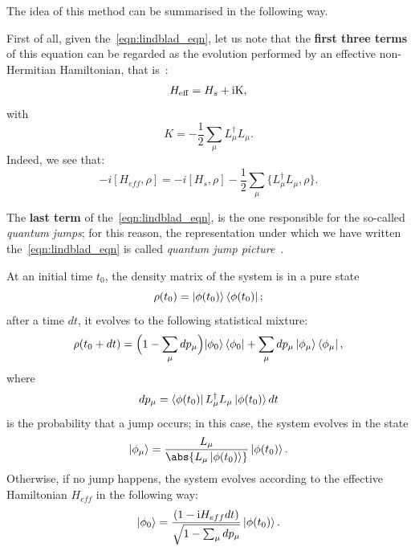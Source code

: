 The idea of this method can be summarised in the following way.

First of all, given the~\ref{eqn:lindblad_eqn}, let us note that the \textbf{first three terms} of this equation can be regarded as the evolution performed by an effective non-Hermitian Hamiltonian, that is~\cite{PhysRevA.69.062317}:
\[
H_{\rm{eff}} = H_s + \rm{i}K,
\]
with
\[
K = -\frac{1}{2}\sum_\mu L_{\mu}^{\dagger}L_{\mu}.
\]
Indeed, we see that:
\[
    -i[H_{eff}, \rho] = -i[H_s, \rho] - \frac{1}{2}\sum_\mu \{L_{\mu}^{\dagger}L_{\mu}, \rho\}.
\]

The \textbf{last term} of the~\ref{eqn:lindblad_eqn}, is the one responsible for the so-called \emph{quantum jumps}; for this reason, the representation under which we have written the~\ref{eqn:lindblad_eqn} is called \emph{quantum jump picture}~\cite{PhysRevA.69.062317}. 

At an initial time $t_0$, the density matrix of the system is in a pure state
\[
\rho(t_0) = \ket{\phi(t_0)}\bra{\phi(t_0)};
\]
after a time $dt$, it evolves to the following statistical mixture:
\begin{equation}
    \rho(t_0 + dt) = \Bigl(1-\sum_\mu dp_\mu \Bigl)\ket{\phi_0}\bra{\phi_0} + \sum_\mu dp_\mu \ket{\phi_\mu}\bra{\phi_\mu},
\end{equation}
where
\begin{equation}
    dp_\mu = \bra{\phi(t_0)}L_{\mu}^{\dagger}L_{\mu}\ket{\phi(t_0)}dt
\end{equation}
is the probability that a jump occurs; in this case, the system evolves in the state
\begin{equation}
\label{eqn:phi_mu}
    \ket{\phi_\mu} = \frac{L_\mu}{\abs{L_\mu\ket{\phi(t_0)}}}\ket{\phi(t_0)}.
\end{equation}
Otherwise, if no jump happens, the system evolves according to the effective Hamiltonian $H_{eff}$ in the following way:
\begin{equation}
    \ket{\phi_0} = \frac{(1-\textrm{i}H_{eff}dt)}{\sqrt{1-\sum_\mu dp_\mu}}\ket{\phi(t_0)}.
\end{equation}

